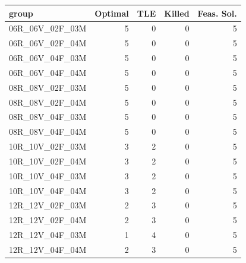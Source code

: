 
\begin{tabular}{lrrrr}
\toprule
group & Optimal & TLE & Killed & Feas. Sol.\\
\midrule
06R\_06V\_02F\_03M & 5 & 0 & 0 & 5\\
06R\_06V\_02F\_04M & 5 & 0 & 0 & 5\\
06R\_06V\_04F\_03M & 5 & 0 & 0 & 5\\
06R\_06V\_04F\_04M & 5 & 0 & 0 & 5\\
08R\_08V\_02F\_03M & 5 & 0 & 0 & 5\\
\addlinespace
08R\_08V\_02F\_04M & 5 & 0 & 0 & 5\\
08R\_08V\_04F\_03M & 5 & 0 & 0 & 5\\
08R\_08V\_04F\_04M & 5 & 0 & 0 & 5\\
10R\_10V\_02F\_03M & 3 & 2 & 0 & 5\\
10R\_10V\_02F\_04M & 3 & 2 & 0 & 5\\
\addlinespace
10R\_10V\_04F\_03M & 3 & 2 & 0 & 5\\
10R\_10V\_04F\_04M & 3 & 2 & 0 & 5\\
12R\_12V\_02F\_03M & 2 & 3 & 0 & 5\\
12R\_12V\_02F\_04M & 2 & 3 & 0 & 5\\
12R\_12V\_04F\_03M & 1 & 4 & 0 & 5\\
\addlinespace
12R\_12V\_04F\_04M & 2 & 3 & 0 & 5\\
\bottomrule
\end{tabular}
